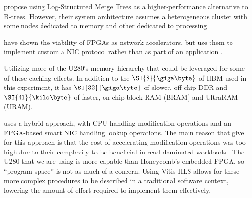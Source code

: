 

\citeauthor{dlsm} propose using Log-Structured Merge Trees as a
higher-performance alternative to B-trees. However, their system architecture
assumes a heterogeneous cluster with some nodes dedicated to memory and other
dedicated to processing \autocite{dlsm}.



\citeauthor{star} have shown the viability of FPGAs as network accelerators, but
use them to implement custom a NIC protocol rather than as part of an
application \autocite{star}.

Utilizing more of the U280's memory hierarchy that could be leveraged for some
of these caching effects. In addition to the $\SI{8}{\giga\byte}$ of HBM used in
this experiment, it has $\SI{32}{\giga\byte}$ of slower, off-chip DDR and
$\SI{41}{\kilo\byte}$ of faster, on-chip block RAM (BRAM) and UltraRAM (URAM).

 uses a hybrid approach, with CPU handling modification
operations and an FPGA-based smart NIC handling lookup operations. The main
reason that \citeauthor{honeycomb} give for this approach is that the cost of
accelerating modification operations was too high due to their complexity to be
beneficial in read-dominated workloads \autocite{honeycomb}. The U280 that we
are using is more capable than Honeycomb's embedded FPGA, so ``program space''
is not as much of a concern. Using Vitis HLS allows for these more complex
procedures to be described in a traditional software context, lowering the
amount of effort required to implement them effectively.
